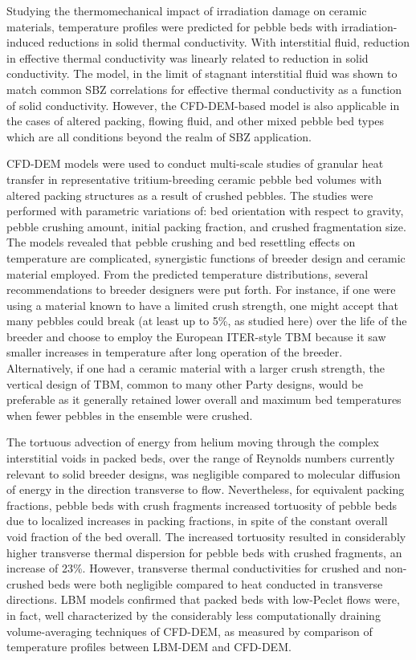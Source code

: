 Studying the thermomechanical impact of irradiation damage on ceramic materials, temperature profiles were predicted for pebble beds with irradiation-induced reductions in solid thermal conductivity. With interstitial fluid, reduction in effective thermal conductivity was linearly related to reduction in solid conductivity. The model, in the limit of stagnant interstitial fluid was shown to match common SBZ correlations for effective thermal conductivity as a function of solid conductivity. However, the CFD-DEM-based model is also applicable in the cases of altered packing, flowing fluid, and other mixed pebble bed types which are all conditions beyond the realm of SBZ application.

CFD-DEM models were used to conduct multi-scale studies of granular heat transfer in representative tritium-breeding ceramic pebble bed volumes with altered packing structures as a result of crushed pebbles. The studies were performed with parametric variations of: bed orientation with respect to gravity, pebble crushing amount, initial packing fraction, and crushed fragmentation size. The models revealed that pebble crushing and bed resettling effects on temperature are complicated, synergistic functions of breeder design and ceramic material employed. From the predicted temperature distributions, several recommendations to breeder designers were put forth. For instance, if one were using a material known to have a limited crush strength, one might accept that many pebbles could break (at least up to 5\%, as studied here) over the life of the breeder and choose to employ the European ITER-style TBM because it saw smaller increases in temperature after long operation of the breeder. Alternatively, if one had a ceramic material with a larger crush strength, the vertical design of TBM, common to many other Party designs, would be preferable as it generally retained lower overall and maximum bed temperatures when fewer pebbles in the ensemble were crushed.

The tortuous advection of energy from helium moving through the complex interstitial voids in packed beds, over the range of Reynolds numbers currently relevant to solid breeder designs, was negligible compared to molecular diffusion of energy in the direction transverse to flow. Nevertheless, for equivalent packing fractions, pebble beds with crush fragments increased tortuosity of pebble beds due to localized increases in packing fractions, in spite of the constant overall void fraction of the bed overall. The increased tortuosity resulted in considerably higher transverse thermal dispersion for pebble beds with crushed fragments, an increase of 23\%. However, transverse thermal conductivities for crushed and non-crushed beds were both negligible compared to heat conducted in transverse directions. LBM models confirmed that packed beds with low-Peclet flows were, in fact, well characterized by the considerably less computationally draining volume-averaging techniques of CFD-DEM, as measured by comparison of temperature profiles between LBM-DEM and CFD-DEM.

